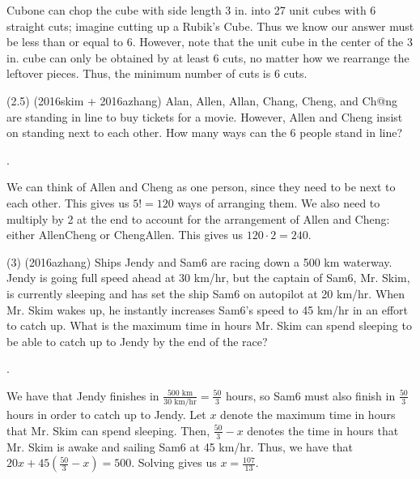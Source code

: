 \documentclass[11pt]{article}
\begin{document}
\begin{solution}
Cubone can chop the cube with side length 3 in. into 27 unit cubes with 6 straight cuts; imagine cutting up a Rubik's Cube. Thus we know our answer must be less than or equal to 6. However, note that the unit cube in the center of the 3 in. cube can only be obtained by at least 6 cuts, no matter how we rearrange the leftover pieces. Thus, the minimum number of cuts is 6 cuts.
\end{solution}

\begin{problem}
(2.5) (2016skim + 2016azhang) Alan, Allen, Allan, Chang, Cheng, and Ch@ng are standing in line to buy tickets for a movie. However, Allen and Cheng insist on standing next to each other. How many ways can the 6 people stand in line?
\end{problem}

\begin{answer}
.
\end{answer}

\begin{solution}
We can think of Allen and Cheng as one person, since they need to be next to each other. This gives us $5! = 120$ ways of arranging them. We also need to multiply by 2 at the end to account for the arrangement of Allen and Cheng: either AllenCheng or ChengAllen. This gives us $120\cdot2 = \boxed{240}$.
\end{solution}

\begin{problem}
(3) (2016azhang) Ships Jendy and Sam6 are racing down a 500 km waterway. Jendy is going full speed ahead at 30 km/hr, but the captain of Sam6, Mr. Skim, is currently sleeping and has set the ship Sam6 on autopilot at 20 km/hr. When Mr. Skim wakes up, he instantly increases Sam6's speed to 45 km/hr in an effort to catch up. What is the maximum time in hours Mr. Skim can spend sleeping to be able to catch up to Jendy by the end of the race?
\end{problem}

\begin{answer}
.
\end{answer}

\begin{solution}
We have that Jendy finishes in $\frac{500 \text{ km}}{30 \text{ km/hr}} = \frac{50}{3}$ hours, so Sam6 must also finish in $\frac{50}{3}$ hours in order to catch up to Jendy. Let $x$ denote the maximum time in hours that Mr. Skim can spend sleeping. Then, $\frac{50}{3} - x$ denotes the time in hours that Mr. Skim is awake and sailing Sam6 at 45 km/hr. Thus, we have that $20x + 45(\frac{50}{3}-x) = 500$. Solving gives us $x = \boxed{\frac{107}{13}}$.
\end{solution}
\end{document}
